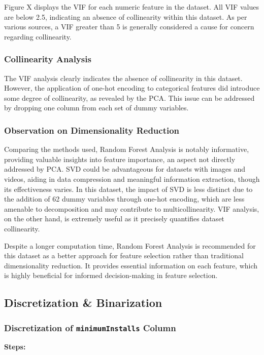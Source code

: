 Figure X displays the VIF for each numeric feature in the dataset. All VIF values are below 2.5, indicating an absence of collinearity within this dataset. As per various sources, a VIF greater than 5 is generally considered a cause for concern regarding collinearity.

\subsubsection{Collinearity Analysis}

The VIF analysis clearly indicates the absence of collinearity in this dataset. However, the application of one-hot encoding to categorical features did introduce some degree of collinearity, as revealed by the PCA. This issue can be addressed by dropping one column from each set of dummy variables.

\subsubsection{Observation on Dimensionality Reduction}

Comparing the methods used, Random Forest Analysis is notably informative, providing valuable insights into feature importance, an aspect not directly addressed by PCA. SVD could be advantageous for datasets with images and videos, aiding in data compression and meaningful information extraction, though its effectiveness varies. In this dataset, the impact of SVD is less distinct due to the addition of 62 dummy variables through one-hot encoding, which are less amenable to decomposition and may contribute to multicollinearity. VIF analysis, on the other hand, is extremely useful as it precisely quantifies dataset collinearity.

Despite a longer computation time, Random Forest Analysis is recommended for this dataset as a better approach for feature selection rather than traditional dimensionality reduction. It provides essential information on each feature, which is highly beneficial for informed decision-making in feature selection.

\subsection{Discretization \& Binarization}
\subsubsection{Discretization of \texttt{minimumInstalls} Column}
\textbf{Steps:}

